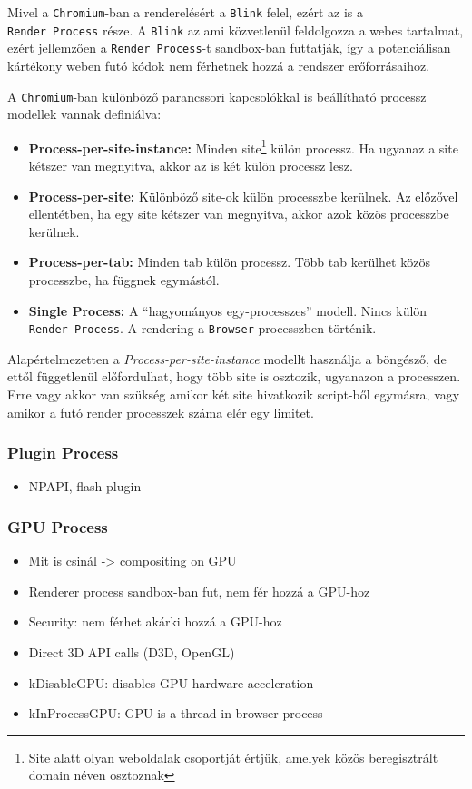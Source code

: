\documentclass[12pt]{report}
\begin{document}
Mivel a \texttt{Chromium}-ban a renderelésért a \texttt{Blink} felel, ezért az is a \\
\texttt{Render Process} része. A \texttt{Blink} az ami közvetlenül feldolgozza a webes
tartalmat, ezért jellemzően a \texttt{Render Process}-t sandbox-ban futtatják, így a
potenciálisan kártékony weben futó kódok nem férhetnek hozzá a rendszer erőforrásaihoz.

A \texttt{Chromium}-ban különböző parancssori kapcsolókkal is beállítható processz modellek
vannak definiálva:
\begin{itemize}
    \item \textbf{Process-per-site-instance:}
        Minden site\footnote{Site alatt olyan weboldalak csoportját értjük, amelyek
        közös beregisztrált domain néven osztoznak} külön processz.
        Ha ugyanaz a site kétszer van megnyitva, akkor az is két külön processz lesz.
    \item \textbf{Process-per-site:}
        Különböző site-ok külön processzbe kerülnek. Az előzővel ellentétben, ha egy site
        kétszer van megnyitva, akkor azok közös processzbe kerülnek.
    \item \textbf{Process-per-tab:}
        Minden tab külön processz. Több tab kerülhet közös processzbe, ha függnek egymástól.
    \item \textbf{Single Process:}
        A ``hagyományos egy-processzes'' modell. Nincs külön \texttt{Render Process}.
        A rendering a \texttt{Browser} processzben történik.
\end{itemize}

Alapértelmezetten a \textit{Process-per-site-instance} modellt használja a böngésző, de
ettől függetlenül előfordulhat, hogy több site is osztozik, ugyanazon a processzen.
Erre vagy akkor van szükség amikor két site hivatkozik script-ből egymásra,
vagy amikor a futó render processzek száma elér egy limitet.
\cite{bib-chromium-process-models}


\subsubsection{Plugin Process}
\begin{itemize}
    \item NPAPI, flash plugin
\end{itemize}

\subsubsection{GPU Process}
\begin{itemize}
    \item Mit is csinál -> compositing on GPU
    \item Renderer process sandbox-ban fut, nem fér hozzá a GPU-hoz
    \item Security: nem férhet akárki hozzá a GPU-hoz
    \item Direct 3D API calls (D3D, OpenGL)
    \item kDisableGPU: disables GPU hardware acceleration
    \item kInProcessGPU: GPU is a thread in browser process
\end{itemize}
\end{document}
